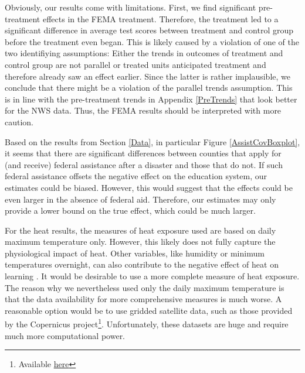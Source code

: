 Obviously, our results come with limitations. First, we find significant pre-treatment effects in the FEMA treatment. Therefore, the treatment led to a significant difference in average test scores between treatment and control group before the treatment even began. This is likely caused by a violation of one of the two identifiying assumptions: Either the trends in outcomes of treatment and control group are not parallel or treated units anticipated treatment and therefore already saw an effect earlier. Since the latter is rather implausible, we conclude that there might be a violation of the parallel trends assumption. This is in line with the pre-treatment trends in Appendix \ref{PreTrends} that look better for the NWS data. Thus, the FEMA results should be interpreted with more caution.

Based on the results from Section \ref{Data}, in particular Figure \ref{AssistCovBoxplot}, it seems that there are significant differences between counties that apply for (and receive) federal assistance after a disaster and those that do not. If such federal assistance offsets the negative effect on the education system, our estimates could be biased. However, this would suggest that the effects could be even larger in the absence of federal aid. Therefore, our estimates may only provide a lower bound on the true effect, which could be much larger.

For the heat results, the measures of heat exposure used are based on daily maximum temperature only. However, this likely does not fully capture the physiological impact of heat. Other variables, like humidity or minimum temperatures overnight, can also contribute to the negative effect of heat on learning \citep[for an extensive discussion of heat exposure measurement see][]{Rennie_2021}. It would be desirable to use a more complete measure of heat exposure. The reason why we nevertheless used only the daily maximum temperature is that the data availability for more comprehensive measures is much worse. A reasonable option would be to use gridded satellite data, such as those provided by the Copernicus project\footnote{Available \href{https://climate.copernicus.eu/}{here}}. Unfortunately, these datasets are huge and require much more computational power.



